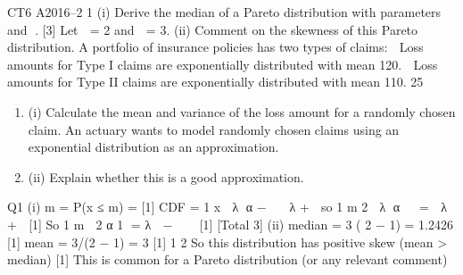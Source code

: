 \documentclass[a4paper,12pt]{article}
\begin{document}
CT6 A2016–2
1 (i) Derive the median of a Pareto distribution with parameters  and . [3]
Let  = 2 and  = 3.
(ii) Comment on the skewness of this Pareto distribution.
 A portfolio of insurance policies has two types of claims:
   Loss amounts for Type I claims are exponentially distributed with mean 120.
 Loss amounts for Type II claims are exponentially distributed with mean 110.
25%
\begin{enumerate}
\item (i) Calculate the mean and variance of the loss amount for a randomly chosen claim.
An actuary wants to model randomly chosen claims using an exponential distribution as an approximation.
\item (ii) Explain whether this is a good approximation.
\end{enumerate}

\newpage
Q1 (i) m = P(x ≤ m) =
  [1]
CDF = 1
x
 λ α −   λ + 
so 1
m 2
 λ α   =  λ + 
[1]
So
1
m  2 α 1 = λ  − 
 
[1]
[Total 3]
(ii) median = 3 ( 2 − 1) = 1.2426 [1]
mean = 3/(2 − 1) = 3 [1]
1
2
So this distribution has positive skew (mean > median) [1]
This is common for a Pareto distribution (or any relevant comment) 
\end{document}
